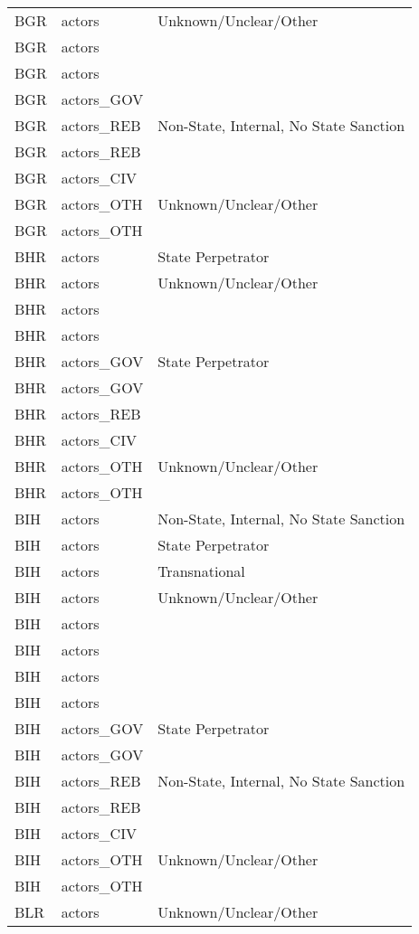 \begin{table}[ht]
\begin{tabular}{lll}
  BGR & actors & Unknown/Unclear/Other \\ 
  BGR & actors &  \\ 
  BGR & actors &  \\ 
  BGR & actors\_GOV &  \\ 
  BGR & actors\_REB & Non-State, Internal, No State Sanction \\ 
  BGR & actors\_REB &  \\ 
  BGR & actors\_CIV &  \\ 
  BGR & actors\_OTH & Unknown/Unclear/Other \\ 
  BGR & actors\_OTH &  \\ 
  BHR & actors & State Perpetrator \\ 
  BHR & actors & Unknown/Unclear/Other \\ 
  BHR & actors &  \\ 
  BHR & actors &  \\ 
  BHR & actors\_GOV & State Perpetrator \\ 
  BHR & actors\_GOV &  \\ 
  BHR & actors\_REB &  \\ 
  BHR & actors\_CIV &  \\ 
  BHR & actors\_OTH & Unknown/Unclear/Other \\ 
  BHR & actors\_OTH &  \\ 
  BIH & actors & Non-State, Internal, No State Sanction \\ 
  BIH & actors & State Perpetrator \\ 
  BIH & actors & Transnational \\ 
  BIH & actors & Unknown/Unclear/Other \\ 
  BIH & actors &  \\ 
  BIH & actors &  \\ 
  BIH & actors &  \\ 
  BIH & actors &  \\ 
  BIH & actors\_GOV & State Perpetrator \\ 
  BIH & actors\_GOV &  \\ 
  BIH & actors\_REB & Non-State, Internal, No State Sanction \\ 
  BIH & actors\_REB &  \\ 
  BIH & actors\_CIV &  \\ 
  BIH & actors\_OTH & Unknown/Unclear/Other \\ 
  BIH & actors\_OTH &  \\ 
  BLR & actors & Unknown/Unclear/Other \\ 

\end{tabular}
\end{table}
